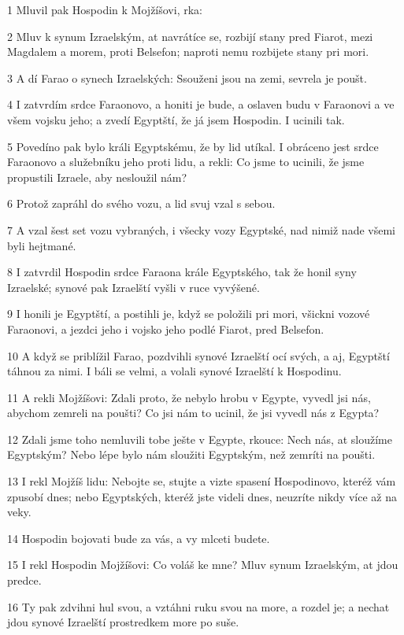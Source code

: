 \par 1 Mluvil pak Hospodin k Mojžíšovi, rka:
\par 2 Mluv k synum Izraelským, at navrátíce se, rozbijí stany pred Fiarot, mezi Magdalem a morem, proti Belsefon; naproti nemu rozbijete stany pri mori.
\par 3 A dí Farao o synech Izraelských: Ssouženi jsou na zemi, sevrela je poušt.
\par 4 I zatvrdím srdce Faraonovo, a honiti je bude, a oslaven budu v Faraonovi a ve všem vojsku jeho; a zvedí Egyptští, že já jsem Hospodin. I ucinili tak.
\par 5 Povedíno pak bylo králi Egyptskému, že by lid utíkal. I obráceno jest srdce Faraonovo a služebníku jeho proti lidu, a rekli: Co jsme to ucinili, že jsme propustili Izraele, aby nesloužil nám?
\par 6 Protož zapráhl do svého vozu, a lid svuj vzal s sebou.
\par 7 A vzal šest set vozu vybraných, i všecky vozy Egyptské, nad nimiž nade všemi byli hejtmané.
\par 8 I zatvrdil Hospodin srdce Faraona krále Egyptského, tak že honil syny Izraelské; synové pak Izraelští vyšli v ruce vyvýšené.
\par 9 I honili je Egyptští, a postihli je, když se položili pri mori, všickni vozové Faraonovi, a jezdci jeho i vojsko jeho podlé Fiarot, pred Belsefon.
\par 10 A když se priblížil Farao, pozdvihli synové Izraelští ocí svých, a aj, Egyptští táhnou za nimi. I báli se velmi, a volali synové Izraelští k Hospodinu.
\par 11 A rekli Mojžíšovi: Zdali proto, že nebylo hrobu v Egypte, vyvedl jsi nás, abychom zemreli na poušti? Co jsi nám to ucinil, že jsi vyvedl nás z Egypta?
\par 12 Zdali jsme toho nemluvili tobe ješte v Egypte, rkouce: Nech nás, at sloužíme Egyptským? Nebo lépe bylo nám sloužiti Egyptským, než zemríti na poušti.
\par 13 I rekl Mojžíš lidu: Nebojte se, stujte a vizte spasení Hospodinovo, kteréž vám zpusobí dnes; nebo Egyptských, kteréž jste videli dnes, neuzríte nikdy více až na veky.
\par 14 Hospodin bojovati bude za vás, a vy mlceti budete.
\par 15 I rekl Hospodin Mojžíšovi: Co voláš ke mne? Mluv synum Izraelským, at jdou predce.
\par 16 Ty pak zdvihni hul svou, a vztáhni ruku svou na more, a rozdel je; a nechat jdou synové Izraelští prostredkem more po suše.
